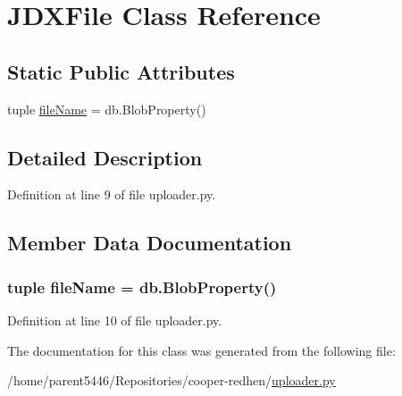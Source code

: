 \hypertarget{classuploader_1_1_j_d_x_file}{
\section{JDXFile Class Reference}
\label{classuploader_1_1_j_d_x_file}
}
\subsection*{Static Public Attributes}
\begin{DoxyCompactItemize}
\item 
tuple \hyperlink{classuploader_1_1_j_d_x_file_a3739982c99dbf3570157a0ba372f0938}{fileName} = db.BlobProperty()
\end{DoxyCompactItemize}


\subsection{Detailed Description}


Definition at line 9 of file uploader.py.



\subsection{Member Data Documentation}
\hypertarget{classuploader_1_1_j_d_x_file_a3739982c99dbf3570157a0ba372f0938}{
\subsubsection[{fileName}]{\setlength{\rightskip}{0pt plus 5cm}tuple {\bf fileName} = db.BlobProperty()}}
\label{classuploader_1_1_j_d_x_file_a3739982c99dbf3570157a0ba372f0938}


Definition at line 10 of file uploader.py.



The documentation for this class was generated from the following file:\begin{DoxyCompactItemize}
\item 
/home/parent5446/Repositories/cooper-\/redhen/\hyperlink{uploader_8py}{uploader.py}\end{DoxyCompactItemize}
